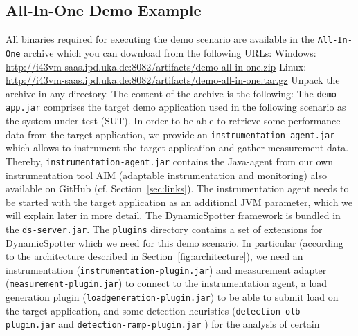 \documentclass{report}
\newcommand{\DS}{DynamicSpotter }
\newcommand{\link}[1]{\textcolor[rgb]{0.0,0.0,1.0}{\href{#1}{#1}}}
\begin{document}
\subsection{All-In-One Demo Example}
All binaries required for executing the demo scenario are available in the \texttt{All-In-One} archive which you can
download from the following URLs:
\newline
\newline
Windows: \link{http://i43vm-saas.ipd.uka.de:8082/artifacts/demo-all-in-one.zip}
\newline
Linux: \link{http://i43vm-saas.ipd.uka.de:8082/artifacts/demo-all-in-one.tar.gz}
\newline
\newline
Unpack the archive in any directory. The content of the archive is the following:
The \texttt{demo-app.jar} comprises the target demo application used in the following scenario as the system under test
(SUT). In order to be able to retrieve some performance data from the target application, we provide an
\texttt{instrumentation-agent.jar} which allows to instrument the target application and gather measurement data.
Thereby, \texttt{instrumentation-agent.jar} contains the Java-agent from our own instrumentation tool AIM
(adaptable instrumentation and monitoring) also available on GitHub (cf. Section~\ref{sec:links}). The
instrumentation agent needs to be started with the target application as an additional JVM parameter, which we will
explain later in more detail. The \DS framework is bundled in the \texttt{ds-server.jar}. The \texttt{plugins} directory
contains a set of extensions for \DS which we need for this demo scenario. In particular (according to the architecture
described in Section~\ref{fig:architecture}), we need an instrumentation (\texttt{instrumentation-plugin.jar}) and
measurement adapter (\texttt{measurement-plugin.jar}) to connect to the instrumentation agent, a load generation
plugin (\texttt{loadgeneration-plugin.jar}) to be able to submit load on the target application, and some detection
heuristics (\texttt{detection-olb-plugin.jar} and \texttt{detection-ramp-plugin.jar} ) for the analysis of certain
\end{document}
